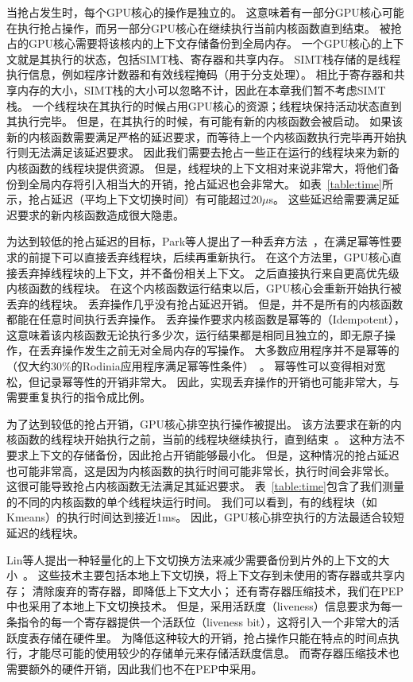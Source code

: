 当抢占发生时，每个GPU核心的操作是独立的。
这意味着有一部分GPU核心可能在执行抢占操作，而另一部分GPU核心在继续执行当前内核函数直到结束。
被抢占的GPU核心需要将该核内的上下文存储备份到全局内存。
一个GPU核心的上下文就是其执行的状态，包括SIMT栈、寄存器和共享内存。
SIMT栈存储的是线程执行信息，例如程序计数器和有效线程掩码（用于分支处理）。
相比于寄存器和共享内存的大小，SIMT栈的大小可以忽略不计，因此在本章我们暂不考虑SIMT栈。
一个线程块在其执行的时候占用GPU核心的资源；线程块保持活动状态直到其执行完毕。
但是，在其执行的时候，有可能有新的内核函数会被启动。
如果该新的内核函数需要满足严格的延迟要求，而等待上一个内核函数执行完毕再开始执行则无法满足该延迟要求。
因此我们需要去抢占一些正在运行的线程块来为新的内核函数的线程块提供资源。
但是，线程块的上下文相对来说非常大，将他们备份到全局内存将引入相当大的开销，抢占延迟也会非常大。
如表~\ref{table:time}所示，抢占延迟（平均上下文切换时间）有可能超过20$\mu$s。
这些延迟给需要满足延迟要求的新内核函数造成很大隐患。

为达到较低的抢占延迟的目标，Park等人提出了一种丢弃方法~，在满足幂等性要求的前提下可以直接丢弃线程块，后续再重新执行。
在这个方法里，GPU核心直接丢弃掉线程块的上下文，并不备份相关上下文。
之后直接执行来自更高优先级内核函数的线程块。
在这个内核函数运行结束以后，GPU核心会重新开始执行被丢弃的线程块。
丢弃操作几乎没有抢占延迟开销。
但是，并不是所有的内核函数都能在任意时间执行丢弃操作。
丢弃操作要求内核函数是幂等的（Idempotent），这意味着该内核函数无论执行多少次，运行结果都是相同且独立的，即无原子操作，在丢弃操作发生之前无对全局内存的写操作。
大多数应用程序并不是幂等的（仅大约30\%的Rodinia应用程序满足幂等性条件）~。
幂等性可以变得相对宽松，但记录幂等性的开销非常大。
因此，实现丢弃操作的开销也可能非常大，与需要重复执行的指令成比例。

为了达到较低的抢占开销，GPU核心排空执行操作被提出。
该方法要求在新的内核函数的线程块开始执行之前，当前的线程块继续执行，直到结束~。
这种方法不要求上下文的存储备份，因此抢占开销能够最小化。
但是，这种情况的抢占延迟也可能非常高，这是因为内核函数的执行时间可能非常长，执行时间会非常长。
这很可能导致抢占内核函数无法满足其延迟要求。
表~\ref{table:time}包含了我们测量的不同的内核函数的单个线程块运行时间。
我们可以看到，有的线程块（如Kmeans）的执行时间达到接近1ms。
因此，GPU核心排空执行的方法最适合较短延迟的线程块。

Lin等人提出一种轻量化的上下文切换方法来减少需要备份到片外的上下文的大小~。
这些技术主要包括本地上下文切换，将上下文存到未使用的寄存器或共享内存；
清除废弃的寄存器，即降低上下文大小；
还有寄存器压缩技术，我们在PEP中也采用了本地上下文切换技术。
但是，采用活跃度（liveness）信息要求为每一条指令的每一个寄存器提供一个活跃位（liveness bit），这将引入一个非常大的活跃度表存储在硬件里。
为降低这种较大的开销，抢占操作只能在特点的时间点执行，才能尽可能的使用较少的存储单元来存储活跃度信息。
而寄存器压缩技术也需要额外的硬件开销，因此我们也不在PEP中采用。

